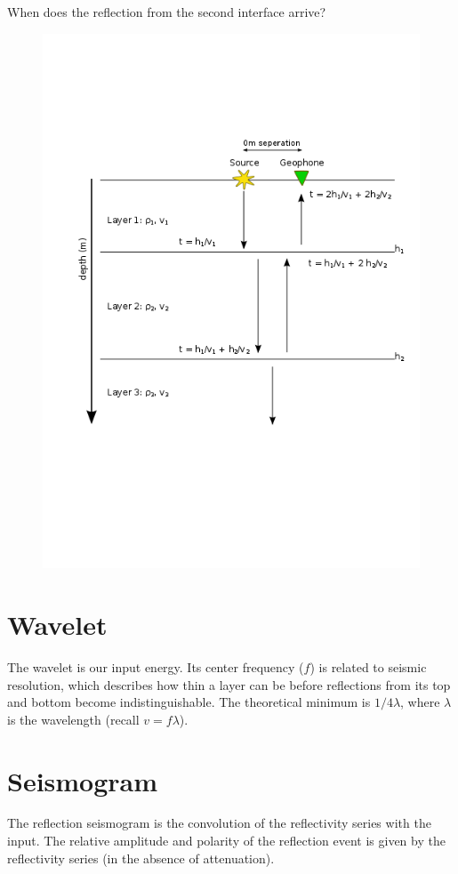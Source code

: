 \documentclass{article}[11pt,oneside]
\begin{document}
When does the reflection from the second interface arrive?


\begin{figure}[H]
	\centering \includegraphics[width=\textwidth]{TimeTravel.png}
\end{figure}

\section*{Wavelet}
The wavelet is our input energy. Its center frequency ($f$) is related to seismic resolution, which describes how thin a layer can be before reflections from its top and bottom become indistinguishable. The theoretical minimum is $1/4 \lambda$, where $\lambda$ is the wavelength (recall $v = f\lambda$).

\section*{Seismogram}
The reflection seismogram is the convolution of the reflectivity series with the input. The relative amplitude and polarity of the reflection event is given by the reflectivity series (in the absence of attenuation).
\end{document}
